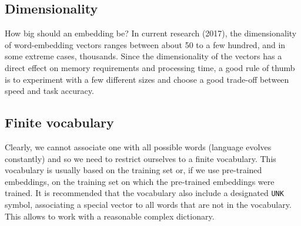 \subsection{Dimensionality}
How big should an embedding be? In current research (2017), the dimensionality of word-embedding vectors ranges between about 50 to a few hundred, and in some extreme cases, thousands. Since the dimensionality of the vectors has a direct effect on memory requirements and processing time, a good rule of thumb is to experiment with a few different sizes and choose a good trade-off between speed and task accuracy.

\subsection{Finite vocabulary}
Clearly, we cannot associate one with all possible words (language evolves constantly) and so we need to restrict ourselves to a finite vocabulary. 
This vocabulary is usually based on the training set or, if we use pre-trained embeddings, on the training set on which the pre-trained embeddings were trained. 
It is recommended that the vocabulary also include a designated \texttt{UNK} symbol, associating a special vector to all words that are not in the vocabulary.
This allows to work with a reasonable complex dictionary.
